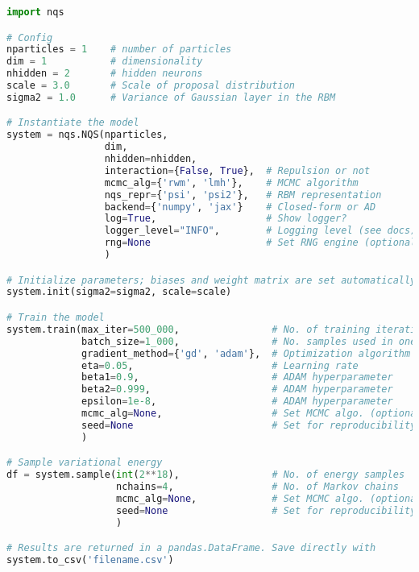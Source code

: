 \begin{lstlisting}[language=python, label={lst:vmc}, caption={Example usage of the NQS framework.}]
import nqs

# Config
nparticles = 1    # number of particles
dim = 1           # dimensionality
nhidden = 2       # hidden neurons
scale = 3.0       # Scale of proposal distribution
sigma2 = 1.0      # Variance of Gaussian layer in the RBM

# Instantiate the model
system = nqs.NQS(nparticles,
                 dim,
                 nhidden=nhidden,
                 interaction={False, True},  # Repulsion or not
                 mcmc_alg={'rwm', 'lmh'},    # MCMC algorithm
                 nqs_repr={'psi', 'psi2'},   # RBM representation
                 backend={'numpy', 'jax'}    # Closed-form or AD
                 log=True,                   # Show logger?
                 logger_level="INFO",        # Logging level (see docs)
                 rng=None                    # Set RNG engine (optional)
                 )

# Initialize parameters; biases and weight matrix are set automatically
system.init(sigma2=sigma2, scale=scale)

# Train the model
system.train(max_iter=500_000,                # No. of training iterations
             batch_size=1_000,                # No. samples used in one update
             gradient_method={'gd', 'adam'},  # Optimization algorithm
             eta=0.05,                        # Learning rate
             beta1=0.9,                       # ADAM hyperparameter
             beta2=0.999,                     # ADAM hyperparameter
             epsilon=1e-8,                    # ADAM hyperparameter
             mcmc_alg=None,                   # Set MCMC algo. (optional)
             seed=None                        # Set for reproducibility
             )

# Sample variational energy
df = system.sample(int(2**18),                # No. of energy samples
                   nchains=4,                 # No. of Markov chains
                   mcmc_alg=None,             # Set MCMC algo. (optional)
                   seed=None                  # Set for reproducibility
                   )

# Results are returned in a pandas.DataFrame. Save directly with
system.to_csv('filename.csv')
\end{lstlisting}